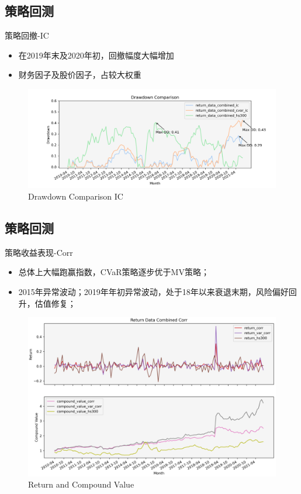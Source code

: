 \documentclass[CJK,aspectratio=43]{beamer}  %
\begin{document}
\subsection{策略回测}
\begin{frame}{策略回撤-IC}
	\begin{itemize}
		\item 在2019年末及2020年初，回撤幅度大幅增加
		\item 财务因子及股价因子，占较大权重
	\end{itemize}
	\begin{figure}
		\centering
		\includegraphics[width=1\linewidth]{"pic/Drawdown_Comparison_IC"}
		\caption{Drawdown Comparison IC}
		\label{fig:icdramdown}
	\end{figure}
\end{frame}

\subsection{策略回测}
\begin{frame}{策略收益表现-Corr}
	\begin{itemize}
	\item 总体上大幅跑赢指数，CVaR策略逐步优于MV策略；
	\item 2015年异常波动；2019年年初异常波动，处于18年以来衰退末期，风险偏好回升，估值修复；
	\end{itemize}
	\begin{figure}
		\centering
		\includegraphics[width=0.79\linewidth]{pic/Corr}
		\caption{Return and Compound Value}
		\label{fig:corr}
	\end{figure}
\end{frame}
\end{document}
